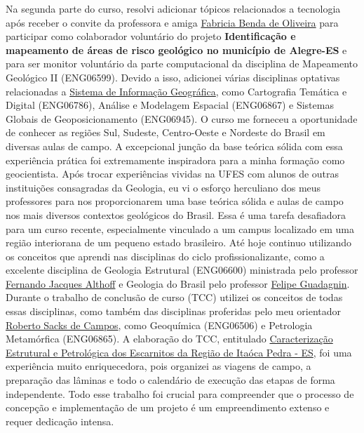 \documentclass[10pt,a4paper,oneside]{book}
\begin{document}
Na segunda parte do curso, resolvi adicionar tópicos relacionados a tecnologia após receber o convite da professora e amiga \href{http://lattes.cnpq.br/9513837515797451}{Fabricia Benda de Oliveira} para participar como colaborador voluntário do projeto \textbf{Identificação e mapeamento de áreas de risco geológico no município de Alegre-ES} e para ser monitor voluntário da parte computacional da disciplina de Mapeamento Geológico II (ENG06599). Devido a isso, adicionei várias disciplinas optativas relacionadas a \href{https://www.gov.br/economia/pt-br/assuntos/patrimonio-da-uniao/arquivos-anteriores-privados/programa-de-modernizacao/linha-do-tempo/34-sig-apostila.pdf}{Sistema de Informação Geográfica}, como Cartografia Temática e Digital (ENG06786), Análise e Modelagem Espacial  (ENG06867) e Sistemas Globais de Geoposicionamento (ENG06945). O curso me forneceu a oportunidade de conhecer as regiões Sul, Sudeste, Centro-Oeste e Nordeste do Brasil em diversas aulas de campo. A excepcional junção da base teórica sólida com essa experiência prática foi extremamente inspiradora para a minha formação como geocientista. Após trocar experiências vividas na UFES com alunos de outras instituições consagradas da Geologia, eu vi o esforço herculiano dos meus professores para nos proporcionarem uma base teórica sólida e aulas de campo nos  mais diversos contextos geológicos do Brasil. Essa é uma tarefa desafiadora para um curso recente, especialmente vinculado a um campus localizado em uma região interiorana de um pequeno estado brasileiro. Até hoje continuo utilizando os conceitos que aprendi nas disciplinas do ciclo profissionalizante, como a excelente disciplina de Geologia Estrutural (ENG06600) ministrada pelo professor \href{http://lattes.cnpq.br/1004206862799097}{Fernando Jacques Althoff} e Geologia do Brasil pelo professor \href{http://lattes.cnpq.br/5883057974133630}{Felipe Guadagnin}. Durante o trabalho de conclusão de curso (TCC) utilizei os conceitos de todas essas disciplinas, como também das disciplinas proferidas pelo meu orientador \href{http://lattes.cnpq.br/5081674111092263}{Roberto Sacks de Campos}, como Geoquímica (ENG06506) e Petrologia Metamórfica (ENG06865). A elaboração do TCC, entitulado \href{https://doi.org/10.6084/m9.figshare.25366483.v1}{Caracterização Estrutural e Petrológica dos Escarnitos da Região de Itaóca Pedra - ES}, foi uma experiência muito enriquecedora, pois organizei as viagens de campo, a preparação das lâminas e todo o calendário de execução das etapas de forma independente. Todo esse trabalho foi crucial para compreender que o processo de concepção e implementação de um projeto é um empreendimento extenso e requer dedicação intensa.
\end{document}
